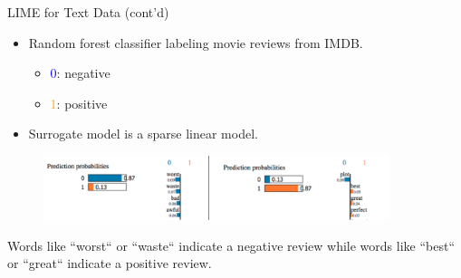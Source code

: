 \documentclass[11pt,compress,t,notes=noshow, aspectratio=169, xcolor=table]{beamer}
\begin{document}
\begin{frame}{LIME for Text Data (cont'd) }	 
	\begin{itemize}
		\item Random forest classifier labeling movie reviews from IMDB. 
		\begin{itemize}
		    \item \textcolor{blue}{0}: negative
		    \item \textcolor{orange}{1}: positive
		\end{itemize}
		\item Surrogate model is a sparse linear model. 
	\end{itemize}
	
	\begin{figure}
		\begin{center}
			\includegraphics[width=0.9\textwidth]{figure/lime_movier}
		\end{center}
	\end{figure}
	
	{Words like ``worst`` or ``waste`` indicate a negative review while words like ``best`` or ``great`` indicate a positive review.}
	
	\end{frame}
	
\end{document}
